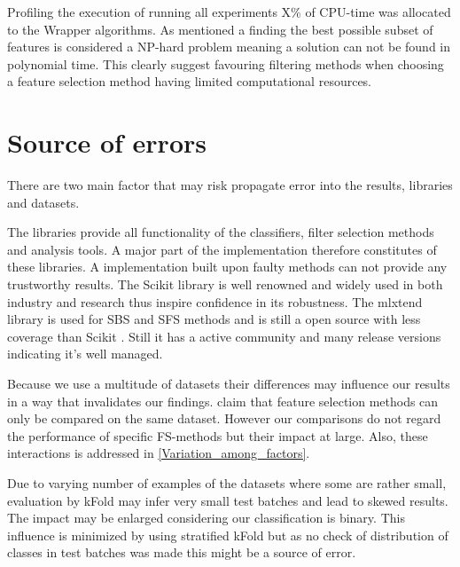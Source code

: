 Profiling the execution of running all experiments X\% of CPU-time was allocated to the Wrapper algorithms. As mentioned a finding the best possible subset of features is considered a NP-hard problem meaning a solution can not be found in polynomial time. This clearly suggest favouring filtering methods when choosing a feature selection method having limited computational resources.

\section{Source of errors}
\label{sec:source_of_errors}

There are two main factor that may risk propagate error into the results, libraries and datasets.

The libraries provide all functionality of the classifiers, filter selection methods and analysis tools. A major part of the implementation therefore constitutes of these libraries. A implementation built upon faulty methods can not provide any trustworthy results. The Scikit library \parencite{scikit-learn} is well renowned and widely used in both industry and research thus inspire confidence in its robustness. The mlxtend library is used for SBS and SFS methods and is still a open source with less coverage than Scikit \parencite{mlextend}. Still it has a active community and many release versions indicating it's well managed.

Because we use a multitude of datasets their differences may influence our results in a way that invalidates our findings. \textcite{c201416} claim that feature selection methods can only be compared on the same dataset. However our comparisons do not regard the performance of specific FS-methods but their impact at large. Also, these interactions is addressed in \ref{Variation_among_factors}.

Due to varying number of examples of the datasets where some are rather small, evaluation by kFold may infer very small test batches and lead to skewed results. The impact may be enlarged considering our classification is binary. This influence is minimized by using stratified kFold but as no check of distribution of classes in test batches was made this might be a source of error.
